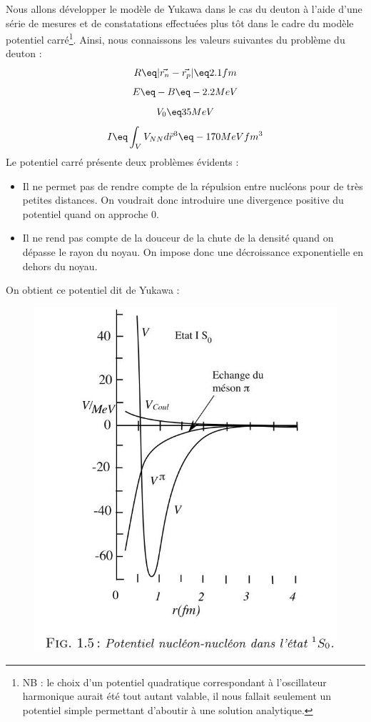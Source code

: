 Nous allons développer le modèle de Yukawa dans le cas du deuton à l'aide d'une série de mesures et de constatations effectuées plus tôt dans le cadre du modèle potentiel carré\footnote{NB : le choix d'un potentiel quadratique correspondant à l'oscillateur harmonique aurait été tout autant valable, il nous fallait seulement un potentiel simple permettant d'aboutir à une solution analytique.}. Ainsi, nous connaissons les valeurs suivantes du problème du deuton :
\begin{equation*}
    R \eq |\Vec{r_n} - \Vec{r_p}| \eq 2.1fm
\end{equation*}
\begin{equation*}
    E \eq -B \eq -2.2MeV
\end{equation*}
\begin{equation*}
    V_0 \eq 35 MeV
\end{equation*}
\begin{equation*}
    I \eq \int_V V_{NN}d\vec{r}^3 \eq -170MeVfm^3
\end{equation*}
Le potentiel carré présente deux problèmes évidents :
\begin{itemize}[label = $\bullet$]
    \item Il ne permet pas de rendre compte de la répulsion entre nucléons pour de très petites distances. On voudrait donc introduire une divergence positive du potentiel quand on approche 0.
    \item Il ne rend pas compte de la douceur de la chute de la densité quand on dépasse le rayon du noyau. On impose donc une décroissance exponentielle en dehors du noyau.
\end{itemize}
On obtient ce potentiel dit de Yukawa :
\begin{figure}[H]
    \centering
    \includegraphics[scale =0.42] {Images4/Potentiel_Yukawa.jpg}
\end{figure}
